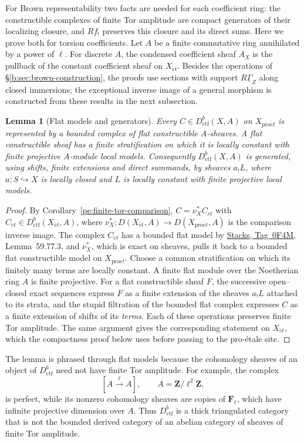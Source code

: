 \documentclass[11pt,a4paper]{article}
\numberwithin{equation}{section}
\newtheorem{lemma}[theorem]{Lemma}
\theoremstyle{definition}
\theoremstyle{remark}
\newcommand{\et}{\acute{e}t}
\newcommand{\proet}{\mathrm{pro}\acute{e}t}
\newcommand{\stacks}[1]{\href{https://stacks.math.columbia.edu/tag/#1}{\textnormal{Stacks, Tag~#1}}}
\newcommand{\Dctf}{D^b_{\mathrm{ctf}}}
\begin{document}
For Brown representability two facts are needed for each coefficient
ring: the constructible complexes of finite Tor amplitude are compact
generators of their localizing closure, and $Rf_!$ preserves this
closure and its direct sums. Here we prove both for torsion
coefficients. Let $A$ be a finite commutative ring annihilated by a
power of $\ell$. For discrete $A$, the condensed coefficient sheaf $A_X$
is the pullback of the constant coefficient sheaf on $X_{\et}$. Besides
the operations of \S\ref{b:sec:brown-construction}, the proofs use
sections with support $R\underline\Gamma_Z$ along closed immersions;
the exceptional inverse image of a general morphism is constructed from
these results in the next subsection.

\begin{lemma}[Flat models and generators]
\label{ctf:finite-models}
Every $C\in\Dctf(X,A)$ on $X_{\proet}$ is represented by a bounded complex of
flat constructible $A$-sheaves. A flat constructible sheaf has a finite
stratification on which it is locally constant with finite projective
$A$-module local models. Consequently $\Dctf(X,A)$ is generated, using
shifts, finite extensions and direct summands, by sheaves $a_!L$, where
$a:S\hookrightarrow X$ is locally closed and $L$ is locally constant
with finite projective local models.
\end{lemma}
\begin{proof}
By Corollary~\ref{pe:finite-tor-comparison}, $C=\nu_X^*C_{\et}$ with
$C_{\et}\in\Dctf(X_{\et},A)$, where
$\nu_X^*\colon D(X_{\et},A)\to D(X_{\proet},A)$ is the comparison inverse
image. The complex $C_{\et}$ has a bounded flat model by \stacks{0F4M},
Lemma~59.77.3, and $\nu_X^*$, which is exact on sheaves, pulls it back to a bounded flat
constructible model on $X_{\proet}$. Choose a common stratification on
which its finitely many terms are locally constant. A finite flat
module over the Noetherian ring $A$ is finite projective. For a flat
constructible sheaf $F$, the successive open--closed exact sequences
express $F$ as a finite extension of the sheaves $a_!L$ attached to its
strata, and the stupid filtration of the bounded flat complex expresses
$C$ as a finite extension of shifts of its \emph{terms}. Each of these
operations preserves finite Tor amplitude. The same argument gives the
corresponding statement on $X_{\et}$, which the compactness proof below
uses before passing to the pro-\'etale site.
\end{proof}

The lemma is phrased through flat models because the cohomology
sheaves of an object of $\Dctf$ need not have finite Tor amplitude.
For example, the complex
\[
 [A\xrightarrow{\ell}A],\qquad A=\mathbf Z/\ell^2\mathbf Z,
\]
is perfect, while its nonzero cohomology sheaves are copies
of $\mathbf F_\ell$, which have infinite projective dimension over $A$.
Thus $\Dctf$ is a thick triangulated category that is not the bounded
derived category of an abelian category of sheaves of finite Tor
amplitude.
\end{document}
